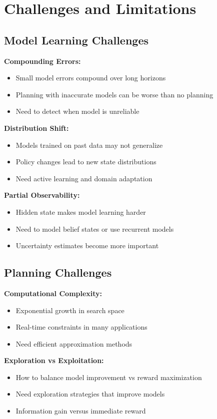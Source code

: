\section{Challenges and Limitations}

\subsection{Model Learning Challenges}

\textbf{Compounding Errors:}
\begin{itemize}
    \item Small model errors compound over long horizons
    \item Planning with inaccurate models can be worse than no planning
    \item Need to detect when model is unreliable
\end{itemize}

\textbf{Distribution Shift:}
\begin{itemize}
    \item Models trained on past data may not generalize
    \item Policy changes lead to new state distributions
    \item Need active learning and domain adaptation
\end{itemize}

\textbf{Partial Observability:}
\begin{itemize}
    \item Hidden state makes model learning harder
    \item Need to model belief states or use recurrent models
    \item Uncertainty estimates become more important
\end{itemize}

\subsection{Planning Challenges}

\textbf{Computational Complexity:}
\begin{itemize}
    \item Exponential growth in search space
    \item Real-time constraints in many applications
    \item Need efficient approximation methods
\end{itemize}

\textbf{Exploration vs Exploitation:}
\begin{itemize}
    \item How to balance model improvement vs reward maximization
    \item Need exploration strategies that improve models
    \item Information gain versus immediate reward
\end{itemize}

